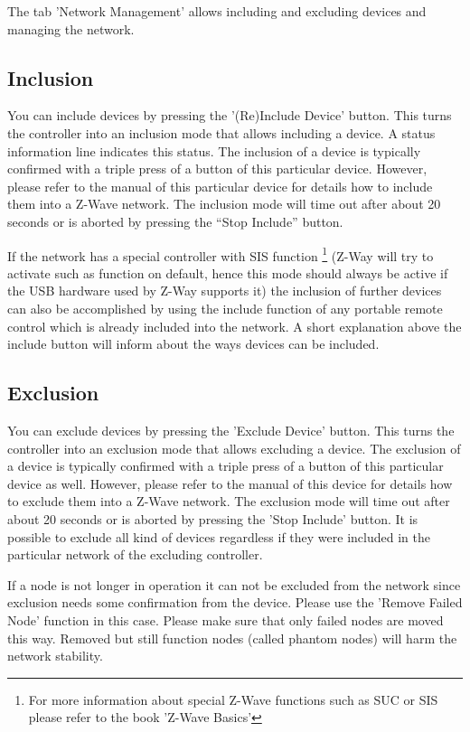 The tab 'Network Management' allows including and excluding devices and managing the network. 

\subsection{Inclusion}

You can include devices by pressing the '(Re)Include Device' button. This turns the controller 
into an inclusion mode that allows including a device.  A status information line indicates 
this status. The inclusion of a device is typically confirmed with a triple press of a 
button of this particular device. However, please refer to the manual of this particular 
device for details how to include them into a Z-Wave network. The inclusion mode will time 
out after about 20 seconds or is aborted by pressing the “Stop Include” button.

If the network has a special controller with SIS function \footnote{For more information about
special Z-Wave functions such as SUC or SIS please refer to the book 'Z-Wave Basics'}
(Z-Way will try to activate such 
as function on default, hence this mode should always be active if the USB hardware used by 
Z-Way supports it) the inclusion of further devices can also be accomplished by using the 
include function of any portable remote control which is already included into the network.   
A short explanation above the include button will inform about the ways devices can be included.

\subsection{Exclusion}

You can exclude devices by pressing the 'Exclude Device' button. This turns the controller 
into an exclusion mode that allows excluding a device. The exclusion of a device is typically 
confirmed with a triple press of a button of this particular device as well. However, please 
refer to the manual of this device for details how to exclude them into a Z-Wave network. The 
exclusion mode will time out after about 20 seconds or is aborted by pressing the 
'Stop Include' button.
It is possible to exclude all kind of devices regardless if they were included in the particular 
network of the excluding controller.

If a node is not longer in operation it can not be excluded from the network since exclusion 
needs some confirmation from the device. Please use the 'Remove Failed Node' function in this case. 
Please make sure that only failed nodes are moved this way. Removed but still function nodes 
(called phantom nodes) will harm the network stability.


